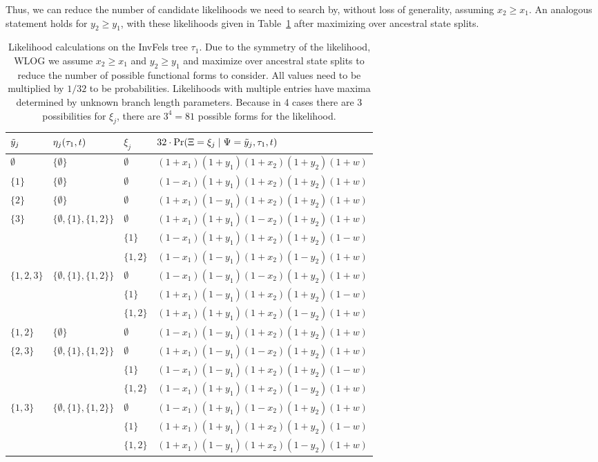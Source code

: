 Thus, we can reduce the number of candidate likelihoods we need to search by, without loss of generality, assuming $x_2 \ge x_1$.
An analogous statement holds for $y_2 \ge y_1$, with these likelihoods given in Table~\ref{tab:likelihoods} after maximizing over ancestral state splits.

\begin{table}
\centering
\begin{tabular}{|lll|l|}
\hline
$\tilde{y}_j$ & $\eta_j(\tau_1, t)$ & $\xi_j$ & $32\cdot\Pr(\Xi=\xi_j \mid \Psi=\tilde{y}_j,\tau_1,t)$\\
\hline
$\emptyset$&$\{\emptyset\}$&$\emptyset$&$(1+x_1)(1+y_1)(1+x_2)(1+y_2)(1+w)$\\

$\{1\}$    &$\{\emptyset\}$&$\emptyset$&$(1-x_1)(1+y_1)(1+x_2)(1+y_2)(1+w)$\\

$\{2\}$    &$\{\emptyset\}$&$\emptyset$&$(1+x_1)(1-y_1)(1+x_2)(1+y_2)(1+w)$\\

$\{3\}$    &$\{\emptyset,\{1\},\{1,2\}\}$&$\emptyset$&$(1+x_1)(1+y_1)(1-x_2)(1+y_2)(1+w)$\\
&&$\{1\}$&$(1-x_1)(1+y_1)(1+x_2)(1+y_2)(1-w)$\\
&&$\{1,2\}$&$(1-x_1)(1-y_1)(1+x_2)(1-y_2)(1+w)$\\

$\{1,2,3\}$&$\{\emptyset,\{1\},\{1,2\}\}$&$\emptyset$&$(1-x_1)(1-y_1)(1-x_2)(1+y_2)(1+w)$\\
&&$\{1\}$&$(1+x_1)(1-y_1)(1+x_2)(1+y_2)(1-w)$\\
&&$\{1,2\}$&$(1+x_1)(1+y_1)(1+x_2)(1-y_2)(1+w)$\\

$\{1,2\}$  &$\{\emptyset\}$&$\emptyset$&$(1-x_1)(1-y_1)(1+x_2)(1+y_2)(1+w)$\\

$\{2,3\}$  &$\{\emptyset,\{1\},\{1,2\}\}$&$\emptyset$&$(1+x_1)(1-y_1)(1-x_2)(1+y_2)(1+w)$\\
&&$\{1\}$&$(1-x_1)(1-y_1)(1+x_2)(1+y_2)(1-w)$\\
&&$\{1,2\}$&$(1-x_1)(1+y_1)(1+x_2)(1-y_2)(1+w)$\\

$\{1,3\}$  &$\{\emptyset,\{1\},\{1,2\}\}$&$\emptyset$&$(1-x_1)(1+y_1)(1-x_2)(1+y_2)(1+w)$\\
&&$\{1\}$&$(1+x_1)(1+y_1)(1+x_2)(1+y_2)(1-w)$\\
&&$\{1,2\}$&$(1+x_1)(1-y_1)(1+x_2)(1-y_2)(1+w)$\\
\hline
\end{tabular}
\caption{
Likelihood calculations on the InvFels tree $\tau_1$.
Due to the symmetry of the likelihood, WLOG we assume $x_2 \ge x_1$ and $y_2 \ge y_1$ and maximize over ancestral state splits to reduce the number of possible functional forms to consider.
All values need to be multiplied by $1/32$ to be probabilities.
Likelihoods with multiple entries have maxima determined by unknown branch length parameters.
Because in 4 cases there are 3 possibilities for $\xi_j$, there are $3^4=81$ possible forms for the likelihood.
}
\label{tab:likelihoods}
\end{table}

